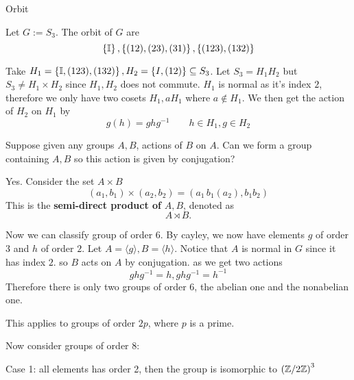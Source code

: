 \begin{definition}
	Orbit
\end{definition}
\begin{example}
	Let $G := S_3$. The orbit of $G$ are
	\[ \left\{ \mathbb I \right\}, \left\{ (12), (23), (31) \right\}, \left\{ (123), (132) \right\}\]
\end{example}
\begin{example}
	Take $H_1 = \left\{ \mathbb I, (123), (132) \right\}, H_2 = \left\{ I, (12) \right\} \subseteq S_3$. Let $S_3 = H_1H_2$ but $S_3 \neq H_1 \times H_2$ since $H_1, H_2$ does not commute. $H_1$ is normal as it's index $2$, therefore we only have two cosets $H_1,aH_1$ where $a \not\in H_1$. We then get the action of $H_2$ on $H_1$ by
	\[ g(h) = ghg^{-1} \qquad h \in H_1, g \in H_2\]
\end{example}
\begin{question}
	Suppose given any groups $A,B$, actions of $B$ on $A$. Can we form a group containing $A,B$ so this action is given by conjugation?
\end{question}
\begin{answer}
	Yes. Consider the set $A \times B$
	\[ (a_1, b_1) \times (a_2, b_2) = (a_1 \, b_1(a_2), b_1b_2)\]
	This is the \textbf{semi-direct product of} $A,B$, denoted as
	\[ A \rtimes B.\]
\end{answer}
Now we can classify group of order $6$. By cayley, we now have elements $g$ of order $3$ and $h$ of order $2$. Let $A = \langle g \rangle, B = \langle h \rangle$. Notice that $A$ is normal in $G$ since it has index $2$. so $B$ acts on $A$ by conjugation. as we get two actions
\[ ghg^{-1} = h, ghg^{-1} = h^{-1}\]  
Therefore there is only two groups of order $6$, the abelian one and the nonabelian one.
\begin{remark}
	This applies to groups of order $2p$, where $p$ is a prime.
\end{remark}
Now consider groups of order $8$:

Case 1: all elements has order 2, then the group is isomorphic to $\left(\mathbb Z/ 2 \mathbb Z \right)^3$

